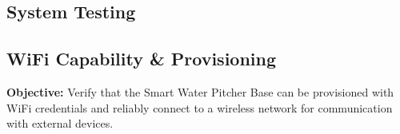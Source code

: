 
\subsection{System Testing}

\subsection*{WiFi Capability \& Provisioning}

\noindent{}\textbf{Objective:}
Verify that the Smart Water Pitcher Base can be provisioned with WiFi credentials and
reliably connect to a wireless network for communication with external devices.\\

